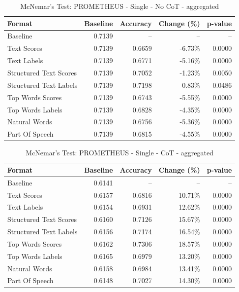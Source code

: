 \begin{table}[htbp]
\centering
\caption{McNemar's Test: PROMETHEUS - Single - No CoT - aggregated}
\label{tab:prometheus-single-no_chain_of_thought-aggregated}
\begin{tabular}{lrrrr}
\toprule
Format & Baseline & Accuracy & Change (\%) & p-value \\
\midrule
Baseline & 0.7139 & -- & -- & -- \\
Text Scores & 0.7139 & 0.6659 & -6.73\% & 0.0000 \\
Text Labels & 0.7139 & 0.6771 & -5.16\% & 0.0000 \\
Structured Text Scores & 0.7139 & 0.7052 & -1.23\% & 0.0050 \\
Structured Text Labels & 0.7139 & 0.7198 & 0.83\% & 0.0486 \\
Top Words Scores & 0.7139 & 0.6743 & -5.55\% & 0.0000 \\
Top Words Labels & 0.7139 & 0.6828 & -4.35\% & 0.0000 \\
Natural Words & 0.7139 & 0.6756 & -5.36\% & 0.0000 \\
Part Of Speech & 0.7139 & 0.6815 & -4.55\% & 0.0000 \\
\bottomrule
\end{tabular}
\end{table}

\begin{table}[htbp]
\centering
\caption{McNemar's Test: PROMETHEUS - Single - CoT - aggregated}
\label{tab:prometheus-single-chain_of_thought_True-aggregated}
\begin{tabular}{lrrrr}
\toprule
Format & Baseline & Accuracy & Change (\%) & p-value \\
\midrule
Baseline & 0.6141 & -- & -- & -- \\
Text Scores & 0.6157 & 0.6816 & 10.71\% & 0.0000 \\
Text Labels & 0.6154 & 0.6931 & 12.62\% & 0.0000 \\
Structured Text Scores & 0.6160 & 0.7126 & 15.67\% & 0.0000 \\
Structured Text Labels & 0.6156 & 0.7174 & 16.54\% & 0.0000 \\
Top Words Scores & 0.6162 & 0.7306 & 18.57\% & 0.0000 \\
Top Words Labels & 0.6165 & 0.6979 & 13.20\% & 0.0000 \\
Natural Words & 0.6158 & 0.6984 & 13.41\% & 0.0000 \\
Part Of Speech & 0.6148 & 0.7027 & 14.30\% & 0.0000 \\
\bottomrule
\end{tabular}
\end{table}

